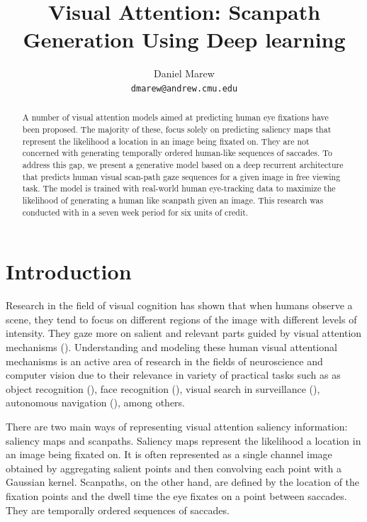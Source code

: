 \documentclass{article} %
\title{Visual Attention: Scanpath Generation Using Deep learning}
\author{
Daniel Marew \\
\texttt{dmarew@andrew.cmu.edu} \\
}
\begin{document}
\maketitle

\begin{abstract}
A number of visual attention models aimed at predicting human eye fixations  have been proposed. The majority of these, focus solely on predicting saliency maps that represent the likelihood a location in an image being fixated on. They are not concerned with generating temporally ordered human-like sequences of saccades. To address this gap, we present a generative model based on a deep recurrent architecture that
predicts human visual scan-path gaze sequences for a given image in  free viewing task. The model is trained with real-world human eye-tracking data to maximize the likelihood of generating a human like scanpath given an image. This research was conducted with in a seven week period for six units of credit.
\end{abstract}

\section{Introduction}

Research in the field of visual cognition has shown that when humans observe a scene, they tend to focus on different regions of the image with different levels of intensity. They gaze more on salient and relevant parts guided by visual attention mechanisms (\cite{rensink_2000}). Understanding and modeling these human visual attentional mechanisms is an active area of research in the fields of neuroscience and computer vision due to their relevance in variety of practical tasks such as  as object recognition (\cite{paletta_fritz_2007}), face recognition (\cite{goodrich_arel_2012}),  visual search in surveillance (\cite{minut_mahadevan_2001}), autonomous navigation (\cite{borji_ahmadabadi_araabi_2009}), among others.

There are two main ways of representing visual attention saliency information: saliency maps and scanpaths. Saliency maps represent the likelihood a location in an image being fixated on. It is often represented as a single channel image obtained by aggregating salient points and then convolving each point with a Gaussian kernel. Scanpaths, on the other hand, are defined by the location of the fixation points and the dwell time the eye fixates on a point between saccades. They are temporally ordered sequences of saccades. 
\end{document}
